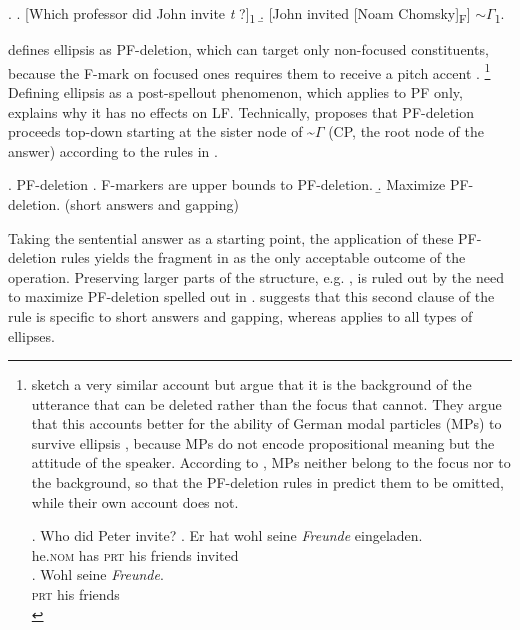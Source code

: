 \ex. \a. [Which professor did John invite \textit{t} ?]\textsubscript{1} \hfill \citep[472]{reich2007}
\b. [John invited [Noam Chomsky]\textsubscript{F}]  $\sim\Gamma$\textsubscript{1}.

\citet{reich2007} defines ellipsis as PF-deletion, which can target only non-focused constituents, because the F-mark on focused ones requires them to receive a pitch accent \citep{selkirk1984}.%
%
\footnote{\label{fn-ott-struckmeier}
\citet{ott.struckmeier2016} sketch a very similar account but argue that it is the background of the utterance that can be deleted rather than the focus that cannot. They argue that this accounts better for the ability of German modal particles (MPs) to survive ellipsis \Next, because MPs do not encode propositional meaning but the attitude of the speaker. According to \citeauthor{ott.struckmeier2016}, MPs neither belong to the focus nor to the background, so that the PF-deletion rules in \citet{reich2007} predict them to be omitted, while their own account does not.

\ex. Who did Peter invite? \hfill\citep[227--228]{ott.struckmeier2016}
\ag. Er hat wohl seine \textit{Freunde} eingeladen.\\
    he.\textsc{nom} has \textsc{prt} his friends invited\\
\bg. Wohl seine \textit{Freunde}.\\
    \textsc{prt} his friends\\

}\afterfn%
%
Defining ellipsis as a post-spellout phenomenon, which applies to PF only, explains why it has no effects on LF. Technically, \citeauthor{reich2007} proposes that PF-deletion proceeds top-down starting at the sister node of \~$\Gamma$ (CP, the root node of the answer) according to the rules in \Next.

\ex. PF-deletion \hfill \citep[473]{reich2007}
\a. F-markers are upper bounds to PF-deletion.
\b. Maximize PF-deletion. \hfill (short answers and gapping)

Taking the sentential answer \LLast[b] as a starting point, the application of these PF-deletion rules yields the fragment in \Next[a] as the only acceptable outcome of the operation. Preserving larger parts of the structure, e.g. \Next[b], is ruled out by the need to maximize PF-deletion spelled out in \Last[b]. \citeauthor{reich2007} suggests that this second clause of the rule is specific to short answers and gapping, whereas \Last[a] applies to all types of ellipses.

